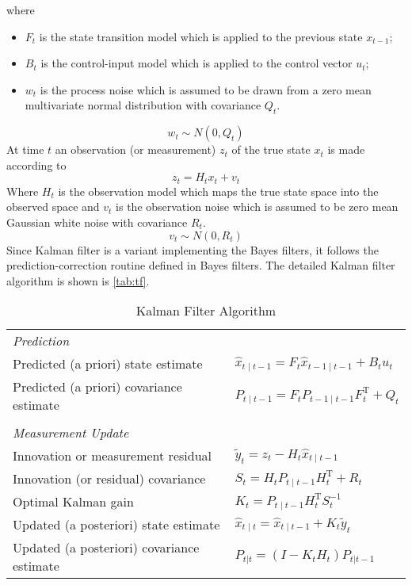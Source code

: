 where
\begin{itemize}
  \item $F_t$ is the state transition model which is applied to the previous state $x_{t-1}$;
  \item $B_t$ is the control-input model which is applied to the control vector $u_t$;
  \item $w_t$ is the process noise which is assumed to be drawn from a zero mean multivariate normal distribution with covariance $Q_t$.
\end{itemize}
$$w_t \sim N(0,Q_t)$$
At time $t$ an observation (or measurement) $z_t$ of the true state $x_t$ is made according to
$$z_t = H_tx_t + v_t$$
Where $H_t$ is the observation model which maps the true state space into the observed space and $v_t$ is the observation noise which is assumed to be zero mean Gaussian white noise with covariance $R_t$.
$$v_t \sim N(0,R_t)$$
Since Kalman filter is a variant implementing the Bayes filters, it follows the prediction-correction routine defined in Bayes filters. The detailed Kalman filter algorithm is shown is \autoref{tab:tf}. \\

\begin{table}[h]
\begin{adjustbox}{max width=\textwidth}
  \centering
  \begin{tabular}{ll}
 \textit{Prediction} & \\
Predicted (a priori) state estimate & $\hat{x}_{t\mid t-1} = F_{t}\hat{x}_{t-1\mid t-1} + B_{t} u_{t}$ \\
Predicted (a priori) covariance estimate & $P_{t\mid t-1} =  F_{t} P_{t-1\mid t-1} F_{t}^{\text{T}} + Q_{t}$\\
&\\
\textit{Measurement Update} & \\
Innovation or measurement residual & $\tilde{y}_t = z_t - H_t\hat{x}_{t\mid t-1}$ \\
Innovation (or residual) covariance & $S_t = H_t P_{t\mid t-1} H_t^\text{T} + R_t$ \\
Optimal Kalman gain & $K_t = P_{t\mid t-1}H_t^\text{T}S_t^{-1}$ \\
Updated (a posteriori) state estimate & $\hat{x}_{t\mid t} = \hat{x}_{t\mid t-1} + K_t\tilde{y}_t$ \\
Updated (a posteriori) covariance estimate & $P_{t|t} = (I - K_t H_t) P_{t|t-1}$ \\
  \end{tabular}
  \end{adjustbox}
  \caption{Kalman Filter Algorithm}
  \label{tab:kf}
\end{table}

